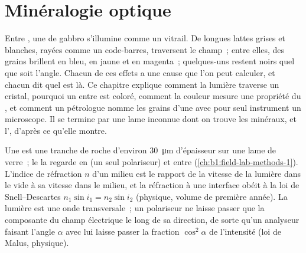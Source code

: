 \chapter{Minéralogie optique}\label{ch:b1:optical-mineralogy}

Entre , une  de gabbro s'illumine comme un vitrail.
De longues lattes grises et blanches, rayées comme un code-barres, traversent le
champ~; entre elles, des grains brillent en bleu, en jaune et en magenta~;
quelques-uns restent noirs quel que soit l'angle. Chacun de ces effets a une
cause que l'on peut calculer, et chacun dit quel  est là. Ce chapitre
explique comment la lumière traverse un cristal, pourquoi un  entre
 est coloré, comment la couleur mesure une propriété du
, et comment un pétrologue nomme les grains d'une  avec pour
seul instrument un microscope. Il se termine par une lame inconnue dont on
trouve les minéraux, et l', d'après ce qu'elle montre.

\begin{recall}
Une  est une tranche de roche d'environ \qty{30}{\micro m} d'épaisseur
sur une lame de verre~; le  la regarde en  (un seul polariseur) et entre 
(\cref{ch:b1:field-lab-methods-1}). L'indice de réfraction $n$ d'un milieu est le
rapport de la vitesse de la lumière dans le vide à sa vitesse dans le milieu, et
la réfraction à une interface obéit à la loi de Snell--Descartes
$n_1\sin i_1 = n_2\sin i_2$ (physique, volume de première année). La lumière est
une onde transversale~; un polariseur ne laisse passer que la composante du champ
électrique le long de sa direction, de sorte qu'un analyseur faisant l'angle
$\alpha$ avec lui laisse passer la fraction $\cos^2\alpha$ de l'intensité (loi de
Malus, physique).
\end{recall}

